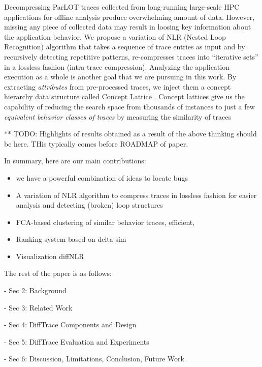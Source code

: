 %
Decompressing ParLOT traces collected from long-running large-scale HPC applications for offline analysis produce overwhelming amount of data. However, missing any piece of collected data may result in loosing key information about the application behavior.
%
We propose a variation of NLR (Nested Loop Recognition) algorithm \cite{Ketterlin-nlr} that takes a sequence of trace entries as input and by recursively detecting repetitive patterns, re-compresses traces into ``iterative sets'' in a lossless fashion (intra-trace compression).  
%
Analyzing the application execution as a whole is another goal that we are pursuing in this work. 
%
By extracting \textit{attributes} from pre-processed traces, we inject them a concept hierarchy data structure called Concept Lattice \cite{clbook}.  
%
Concept lattices give us the capability of reducing the search space from thousands of instances to just a few \textit{equivalent behavior classes of traces} by measuring the similarity of traces\cite{Alqadah2011}
% 

**   TODO: Highlights of results obtained as a result of the above thinking should be here. THis typically comes before ROADMAP of paper.

In summary, here are our main contributions:
\begin{itemize}
\item we have a powerful combination of ideas to locate bugs
\item A variation of NLR algorithm to compress traces in lossless fashion for easier analysis and detecting (broken) loop structures 
\item FCA-based clustering of similar behavior traces, efficient, 
\item Ranking system based on delta-sim
\item Visualization diffNLR
\end{itemize}

%

The rest of the paper is as follows:

- Sec 2: Background

- Sec 3: Related Work

- Sec 4: DiffTrace Components and Design

- Sec 5: DiffTrace Evaluation and Experiments

- Sec 6: Discussion, Limitations, Conclusion, Future Work

